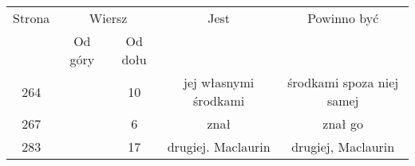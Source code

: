 \documentclass[a4paper,11pt]{article}
\begin{document}











\begin{center}

  \begin{tabular}{|c|c|c|c|c|}
    \hline
    Strona & \multicolumn{2}{c|}{Wiersz} & Jest
                              & Powinno być \\ \cline{2-3}
    & Od góry & Od dołu & & \\
    \hline
    264 & & 10 & jej własnymi środkami & środkami spoza niej samej \\
    267 & &  6 & znał & znał go \\
    283 & & 17 & drugiej. Maclaurin & drugiej, Maclaurin \\
    \hline
  \end{tabular}

\end{center}

\vspace{\spaceTwo}

















\end{document}
